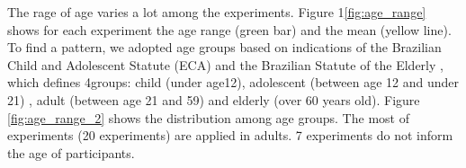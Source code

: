 The rage of age varies a lot among the experiments. Figure 1\ref{fig:age_range} shows for each experiment the age range (green bar) and the mean (yellow line). To find a pattern, we adopted age groups based on indications of the Brazilian Child and Adolescent Statute (ECA) \cite{CasaCivil1990EstatutoAdolescente} and the Brazilian Statute of the Elderly \cite{CasaCivil2003EstatutoIdoso}, which defines 4groups: child (under age12), adolescent (between age 12 and under 21) , adult (between age 21 and 59) and elderly (over 60 years old). Figure \ref{fig:age_range_2} shows the distribution among age groups. The most of experiments (20 experiments) are applied in adults. 7 experiments do not inform the age of participants.

	\begin{figure}[h] 

   	    \captionsetup{width=16cm}%
	\end{figure}

	\begin{figure}[h] 

   	    \captionsetup{width=12cm}%
	\end{figure}

